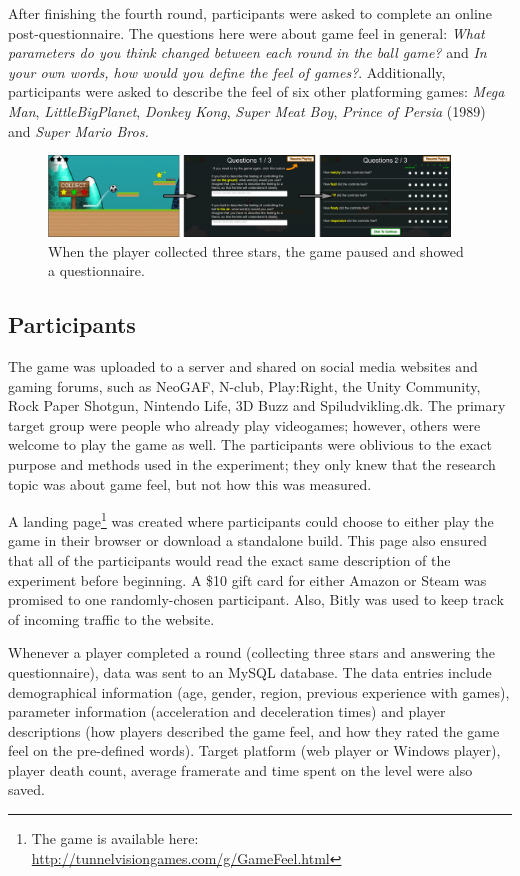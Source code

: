 After finishing the fourth round, participants were asked to complete an online post-questionnaire. The questions here were about game feel in general: \textit{What parameters do you think changed between each round in the ball game?} and \textit{In your own words, how would you define the feel of games?}. Additionally, participants were asked to describe the feel of six other platforming games: \textit{Mega Man}, \textit{LittleBigPlanet}, \textit{Donkey Kong}, \textit{Super Meat Boy}, \textit{Prince of Persia} (1989) and \textit{Super Mario Bros.}

\begin{figure}[htbp]
\centering
\includegraphics[width=0.95\textwidth]{Pics/game_phases}
\caption{When the player collected three stars, the game paused and showed a questionnaire.}
\label{fig:questionnaire}
\end{figure}

\subsection{Participants}
The game was uploaded to a server and shared on social media websites and gaming forums, such as NeoGAF, N-club, Play:Right, the Unity Community, Rock Paper Shotgun, Nintendo Life, 3D Buzz and Spiludvikling.dk. The primary target group were people who already play videogames; however, others were welcome to play the game as well. The participants were oblivious to the exact purpose and methods used in the experiment; they only knew that the research topic was about game feel, but not how this was measured.

A landing page\footnote{The game is available here: \\ \url{http://tunnelvisiongames.com/g/GameFeel.html}} was created where participants could choose to either play the game in their browser or download a standalone build. This page also ensured that all of the participants would read the exact same description of the experiment before beginning. A \$10 gift card for either Amazon or Steam was promised to one randomly-chosen participant. Also, Bitly \cite{bitly} was used to keep track of incoming traffic to the website.

Whenever a player completed a round (collecting three stars and answering the questionnaire), data was  sent to an MySQL database. The data entries include demographical information (age, gender, region, previous experience with games), parameter information (acceleration and deceleration times) and player descriptions (how players described the game feel, and how they rated the game feel on the pre-defined words). Target platform (web player or Windows player), player death count, average framerate and time spent on the level were also saved.

